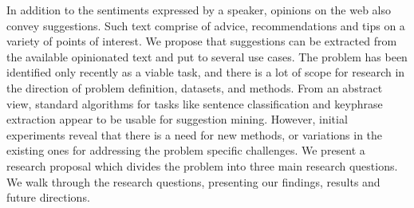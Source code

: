 In addition to the sentiments expressed by a speaker, opinions on the web also convey suggestions. Such text comprise of advice, recommendations and tips on a variety of points of interest. We propose that suggestions can be extracted from the available opinionated text and put to several use cases. The problem has been identified only recently as a viable task, and there is a lot of scope for research in the direction of problem definition, datasets, and methods. From an abstract view, standard algorithms for tasks like sentence classification and keyphrase extraction appear to be usable for suggestion mining. However, initial experiments reveal that there is a need for new methods, or variations in the existing ones for addressing the problem specific challenges. We present a research proposal which divides the problem into three main research questions. We walk through the research questions, presenting our findings, results and future directions.
